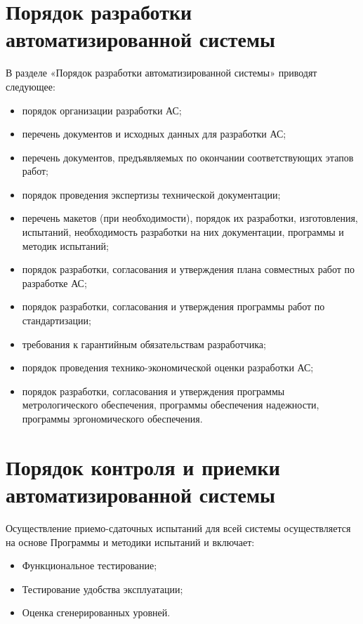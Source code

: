 {\section{Порядок разработки автоматизированной системы}
В разделе «Порядок разработки автоматизированной системы» приводят следующее:
\begin{itemize}
  \item порядок организации разработки АС;
  \item перечень документов и исходных данных для разработки АС;
  \item перечень документов, предъявляемых по окончании соответствующих этапов работ;
  \item порядок проведения экспертизы технической документации;
  \item перечень макетов (при необходимости), порядок их разработки, изготовления, испытаний, необходимость разработки на них документации, программы и методик испытаний;
  \item порядок разработки, согласования и утверждения плана совместных работ по разработке АС;
  \item порядок разработки, согласования и утверждения программы работ по стандартизации;
  \item требования к гарантийным обязательствам разработчика;
  \item порядок проведения технико-экономической оценки разработки АС;
  \item порядок разработки, согласования и утверждения программы метрологического обеспечения, программы обеспечения надежности, программы эргономического обеспечения.
\end{itemize}

\section{Порядок контроля и приемки автоматизированной системы}
Осуществление приемо-сдаточных испытаний для всей системы осуществляется на основе Программы и методики испытаний и включает:
\begin{itemize}
    \item Функциональное тестирование;
    \item Тестирование удобства эксплуатации;
    \item Оценка сгенерированных уровней.
\end{itemize}

}
